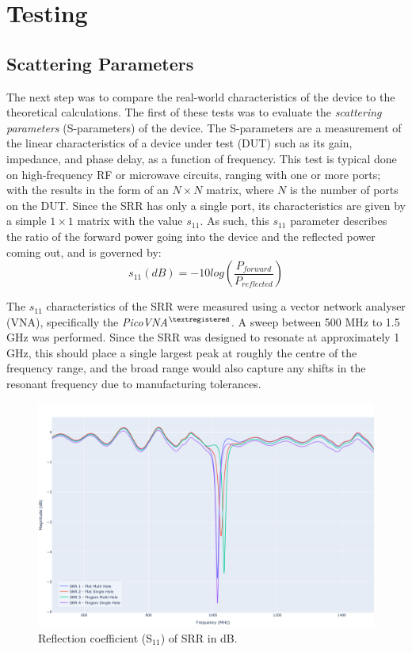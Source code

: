 \section{Testing}
\subsection{Scattering Parameters}
%

The next step was to compare the real-world characteristics of the device to the theoretical calculations. The first of these tests was to evaluate the \textit{scattering parameters} (S-parameters) of the device. The S-parameters are a measurement of the linear characteristics of a device under test (DUT) such as its gain, impedance, and phase delay, as a function of frequency. This test is typical done on high-frequency RF or microwave circuits, ranging with one or more ports; with the results in the form of an $N \times N$ matrix, where $N$ is the number of ports on the DUT. Since the SRR has only a single port, its characteristics are given by a simple $1  \times  1$ matrix with the value $s_{11}$. As such, this $s_{11}$ parameter describes the ratio of the forward power going into the device and the reflected power coming out, and is governed by:
\begin{equation}
    s_{11} (dB) = -10 log (\frac{P_{forward}}{P_{reflected}}) 
\end{equation}

The $s_{11}$ characteristics of the SRR were measured using a vector network analyser (VNA), specifically the \textit{PicoVNA$^{\textregistered}$}. A sweep between 500 MHz to 1.5 GHz was performed. Since the SRR was designed to resonate at approximately 1 GHz, this should place a single largest peak at roughly the centre of the frequency range, and the broad range would also capture any shifts in the resonant frequency due to manufacturing tolerances. 

\begin{figure}[h!]
	\centering
	\includegraphics[width=\linewidth]{chapter_4/figures/S11.png}
	\caption{Reflection coefficient (S$_{11}$) of SRR in dB.}
	\label{fig:SRR_s11}
\end{figure}


